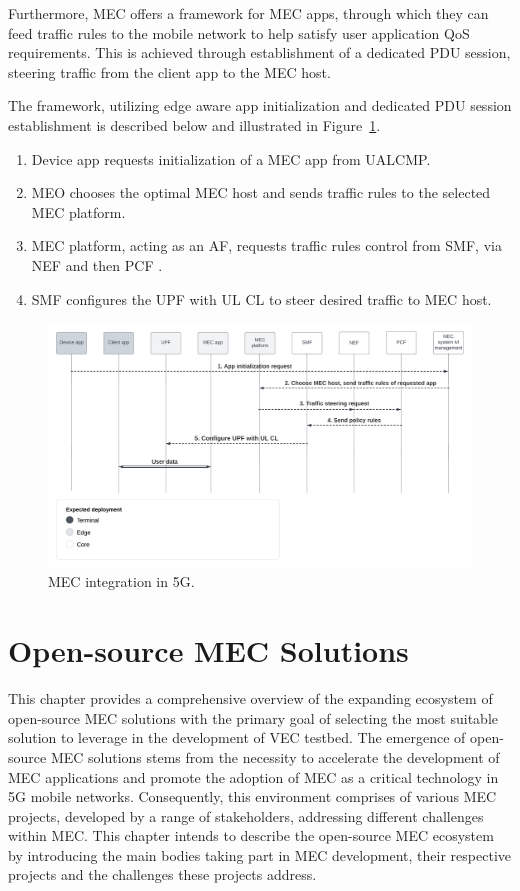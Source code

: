 \documentclass[12pt,a4paper,twoside]{report}
\begin{document}
Furthermore, MEC offers a framework for MEC apps, through which they can feed traffic rules to the mobile network to help satisfy user application QoS requirements. This is achieved through establishment of a dedicated PDU session, steering traffic from the client app to the MEC host.

The framework, utilizing edge aware app initialization and dedicated PDU session establishment is described below and illustrated in Figure~\ref{F:MEC-5G-integration}.
\begin{enumerate}
	\item Device app requests initialization of a MEC app from UALCMP.
	\item MEO chooses the optimal MEC host and sends traffic rules to the selected MEC platform.
	\item MEC platform, acting as an AF, requests traffic rules control from SMF, via NEF and then PCF .
	\item SMF configures the UPF with UL CL to steer desired traffic to MEC host.
\end{enumerate}

\begin{figure}[ht]
	\centering
	\begin{sideways}
		\includegraphics[width=20cm]{./images/MEC-5G-integration-flowchart.png}
	\end{sideways}
	\caption{MEC integration in 5G.}
	\label{F:MEC-5G-integration}
\end{figure}
\FloatBarrier
\chapter{Open-source MEC Solutions}
\label{Ch:o-sMEC}
This chapter provides a comprehensive overview of the expanding ecosystem of open-source MEC solutions with the primary goal of selecting the most suitable solution to leverage in the development of VEC testbed. The emergence of open-source MEC solutions stems from the necessity to accelerate the development of MEC applications and promote the adoption of MEC as a critical technology in 5G mobile networks. Consequently, this environment comprises of various MEC projects, developed by a range of stakeholders, addressing different challenges within MEC. This chapter intends to describe the open-source MEC ecosystem by introducing the main bodies taking part in MEC development, their respective projects and the challenges these projects address.
\end{document}
